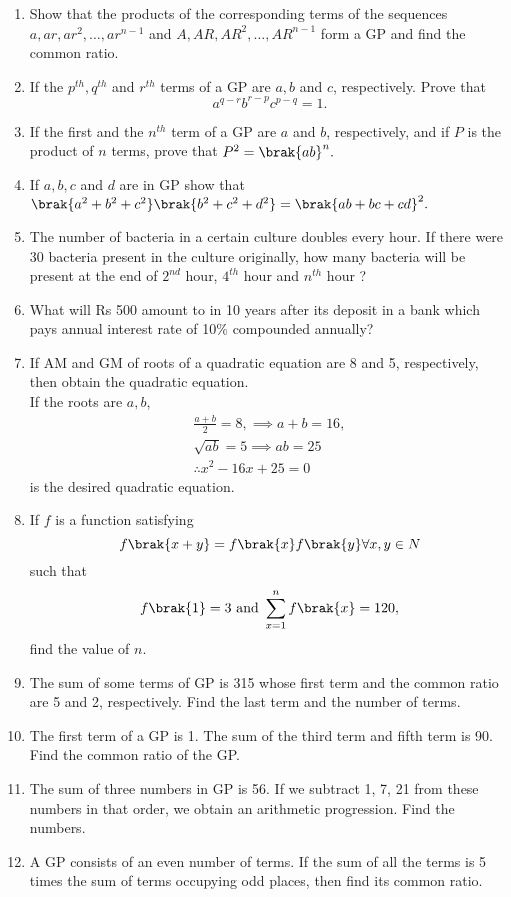 \begin{enumerate}[label=\thesubsection.\arabic*.,ref=\thesubsection.\theenumi]
\item Show that the products of the corresponding terms of the sequences $a, ar, ar^2,\dots,  ar^{n-1}$ and $A, AR, AR^2,\dots,  AR^{n -1}$ form a GP  and find the common ratio.
\item If the $p^{th}, q^{th}$ and $r^{th}$ terms of a GP  are $a, b$ and $c$, respectively. Prove that 
$$a^{q-r} b^{r-p} c^{p-q} = 1.$$
\item If the first and the $n^{th}$ term of a GP  are $a$ and $b$, respectively, and if $P$ is the product of $n$ terms, prove that $P^2 = \brak{ab}^n.$
\item If $a, b, c$ and $d$ are in GP  show that $\brak{a^2 + b^2 + c^2}\brak{b^2 + c^2 + d^2} = \brak{ab + bc + cd}^2.$
\item The number of bacteria in a certain culture doubles every hour. If there were 30 bacteria present in the culture originally, how many bacteria will be present at the end of $2^{nd}$ hour, 
$4^{th}$ hour and $n^{th}$ hour ?
\item What will Rs 500 amount to in 10 years after its deposit in a bank which pays annual interest rate of 10\% compounded annually?
\item If AM  and GM  of roots of a quadratic equation are 8 and 5, respectively, then obtain the quadratic equation.
	\\
	\solution If the roots are $a, b$,
\begin{align}
	\frac{a+b}{2} = 8, \implies a+b = 16,
	\\
	\sqrt{ab} = 5 \implies ab = 25
	\\
	\therefore 
	x^2-16x + 25=0
\end{align}
is the desired quadratic equation.
\item If $f$ is a function satisfying $$f\brak{x +y} = f\brak{x} f\brak{y} \forall x,y \in N$$ such that 
	$$f\brak{1} = 3\text{ and }\sum_{x = 1}^n f\brak{x} = 120,$$ find the value of $n$.
\item The sum of some terms of GP  is 315 whose first term and the common ratio are 5 and 2, respectively. Find the last term and the number of terms.
\item  The first term of a GP  is 1. The sum of the third term and fifth term is 90. Find the common ratio of the GP.
\item The sum of three numbers in GP  is 56. If we subtract 1, 7, 21 from these numbers in that order, we obtain an arithmetic progression. Find the numbers.
\item A GP  consists of an even number of terms. If the sum of all the terms is 5 times the sum of terms occupying odd places, then find its common ratio.

\end{enumerate}
